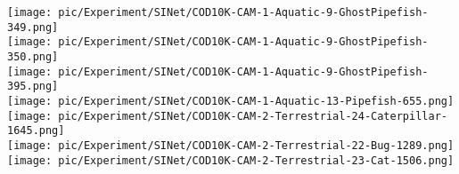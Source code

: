 \documentclass{ecai}
\begin{document}
\begin{figure*}[t]
{\begin{minipage}[t]{0.1\textwidth}
			\vspace{0.01\linewidth}
                \texttt{[image: pic/Experiment/SINet/COD10K-CAM-1-Aquatic-9-GhostPipefish-349.png]}\\
			\vspace{0.01\linewidth}
                \texttt{[image: pic/Experiment/SINet/COD10K-CAM-1-Aquatic-9-GhostPipefish-350.png]}\\
			\vspace{0.01\linewidth}
                \texttt{[image: pic/Experiment/SINet/COD10K-CAM-1-Aquatic-9-GhostPipefish-395.png]}\\
			\vspace{0.01\linewidth}
			\texttt{[image: pic/Experiment/SINet/COD10K-CAM-1-Aquatic-13-Pipefish-655.png]}\\
			\vspace{0.01\linewidth}
			\texttt{[image: pic/Experiment/SINet/COD10K-CAM-2-Terrestrial-24-Caterpillar-1645.png]}\\
			\vspace{0.01\linewidth}
                \texttt{[image: pic/Experiment/SINet/COD10K-CAM-2-Terrestrial-22-Bug-1289.png]}\\
                \vspace{0.01\linewidth}
			\texttt{[image: pic/Experiment/SINet/COD10K-CAM-2-Terrestrial-23-Cat-1506.png]}\\
			\vspace{0.08\linewidth}
		\end{minipage}%
	}\hspace{0.018\columnwidth}
\end{figure*}
\end{document}
